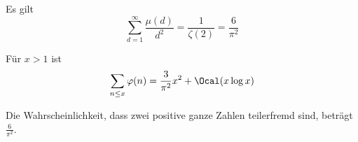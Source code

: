 \begin{lem}\autolabel
	Es gilt
	\[ \sum_{d=1}^\infty \frac{\mu(d)}{d^2} = \frac{1}{\zeta(2)} = \frac{6}{\pi^2} \]
\end{lem}

\begin{thm}\autolabel
	Für $x>1$ ist
	\[ \sum_{n \leq x} \varphi(n) = \frac{3}{\pi^2} x^2 + \Ocal(x\log x) \]
\end{thm}

\begin{cor*}
	Die Wahrscheinlichkeit, dass zwei positive ganze Zahlen teilerfremd sind, beträgt $\frac{6}{\pi^2}$.
\end{cor*}